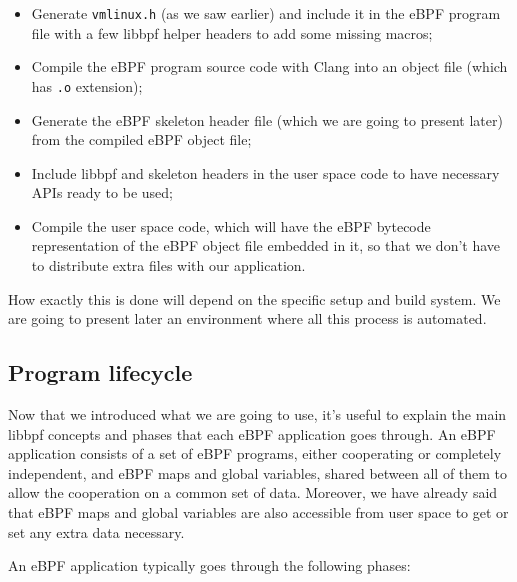 \begin{itemize}
	\item 
		Generate \colorbox{backcolour}{\lstinline[style=commandline, language=bash, breaklines=true]|vmlinux.h|} (as we saw earlier) and include it in the eBPF program file with a few libbpf helper headers to add some missing macros; 
	\item 
		Compile the eBPF program source code with Clang into an object file (which has \colorbox{backcolour}{\lstinline[style=commandline, language=bash, breaklines=true]|.o|} extension);
	\item 
		Generate the eBPF skeleton header file (which we are going to present later) from the compiled eBPF object file;
	\item 
		Include libbpf and skeleton headers in the user space code to have necessary APIs ready to be used;
	\item 
		Compile the user space code, which will have the eBPF bytecode representation of the eBPF object file embedded in it, so that we don’t have to distribute extra files with our application.
\end{itemize}

How exactly this is done will depend on the specific setup and build system.
We are going to present later an environment where all this process is automated.

\subsection{Program lifecycle}

Now that we introduced what we are going to use, it’s useful to explain the main libbpf concepts and phases that each eBPF application goes through. 
An eBPF application consists of a set of eBPF programs, either cooperating or completely independent, and eBPF maps and global variables, shared between all of them to allow the cooperation on a common set of data. 
Moreover, we have already said that eBPF maps and global variables are also accessible from user space to get or set any extra data necessary. 

An eBPF application typically goes through the following phases:

